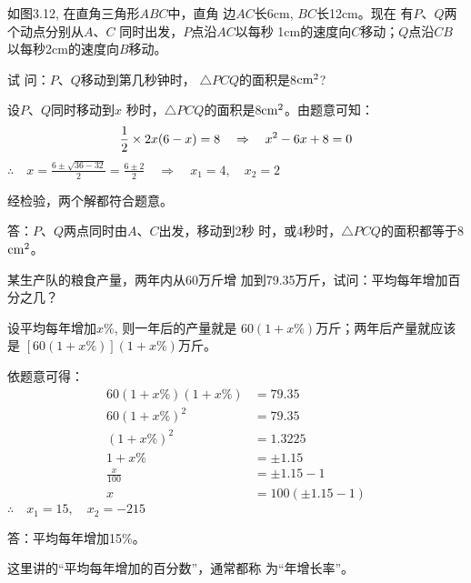 \begin{example}
    如图3.12, 在直角三角形$ABC$中，直角
    边$AC$长6cm, $BC$长12cm。现在
    有$P$、$Q$两个动点分别从$A$、$C$
    同时出发，$P$点沿$AC$以每秒
    1cm的速度向$C$移动；$Q$点沿$CB$
    以每秒2cm的速度向$B$移动。
    
    试
    问：$P$、$Q$移动到第几秒钟时，
    $\triangle PCQ$的面积是8${\rm cm^2}$?
\end{example}

\begin{figure}[htp]
    \begin{center}
    \end{center}
    \caption{}
\end{figure}



\begin{solution}
设$P$、$Q$同时移动到$x$
秒时，$\triangle PCQ$的面积是8${\rm cm^2}$。由题意可知：
\[\dfrac{1}{2}\times 2x(6-x)=8\quad \Rightarrow\quad x^2-6x+8=0\]
$\therefore\quad x=\frac{6\pm\sqrt{36-32}}{2}=\frac{6\pm 2}{2}\quad\Rightarrow\quad x_1=4,\quad x_2=2$

经检验，两个解都符合题意。

答：$P$、$Q$两点同时由$A$、$C$出发，移动到2秒
时，或4秒时，$\triangle PCQ$的面积都等于8${\rm cm^2}$。
\end{solution}

\begin{example}
某生产队的粮食产量，两年内从60万斤增
加到79.35万斤，试问：平均每年增加百分之几？

\end{example}

\begin{solution}
设平均每年增加$x\%$, 则一年后的产量就是
$60(1+x\%)$万斤；两年后产量就应该是
$[60(1+x\%)](1+x\%)$万斤。

依题意可得：    
\[\begin{split}
    60(1+x\%)(1+x\%)&=79.35\\
60(1+x\%)^2&=79.35\\
(1+x\%)^2&=1.3225\\
1+x\%&=\pm 1.15\\
\frac{x}{100}&=\pm 1.15-1\\
x&=100(\pm 1.15-1)
\end{split}\]
$\therefore\quad x_1=15,\quad x_2=-215$

答：平均每年增加15\%。

这里讲的“平均每年增加的百分数”，通常都称
为“年增长率”。
\end{solution}

